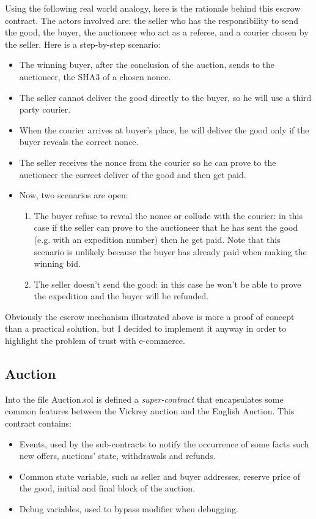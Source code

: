 \documentclass{article}
\begin{document}
Using the following real world analogy, here is the rationale behind this escrow contract. The actors involved are: the seller who has the responsibility to send the good, the buyer, the auctioneer who act as a referee, and a courier chosen by the seller. Here is a step-by-step scenario:
\begin{itemize}
    \item The winning buyer, after the conclusion of the auction, sends to the auctioneer, the SHA3 of a chosen nonce.
    \item The seller cannot deliver the good directly to the buyer, so he will use a third party courier.
    \item When the courier arrives at buyer's place, he will deliver the good only if the buyer reveals the correct nonce. 
    \item The seller receives the nonce from the courier so he can prove to the auctioneer the correct deliver of the good and then get paid.
    \item Now, two scenarios are open:
    \begin{enumerate}
        \item The buyer refuse to reveal the nonce or collude with the courier: in this case if the seller can prove to the auctioneer that he has sent the good (e.g. with an expedition number) then he get paid. Note that this scenario is unlikely because the buyer has already paid when making the winning bid.
        \item The seller doesn't send the good: in this case he won't be able to prove the expedition and the buyer will be refunded.
    \end{enumerate}
\end{itemize}

Obviously the escrow mechanism illustrated above is more a proof of concept than a practical solution, but I decided to implement it anyway in order to highlight the problem of trust with e-commerce.
\subsection{Auction}
Into the file Auction.sol is defined a \textit{super-contract} that encapsulates some common features between the Vickrey auction and the English Auction.
This contract contains:
\begin{itemize}
    \item Events, used by the sub-contracts to notify the occurrence of some facts such new offers, auctions' state, withdrawals and refunds.
    \item Common state variable, such as seller and buyer addresses, reserve price of the good, initial and final block of the auction.
    \item Debug variables, used to bypass modifier when debugging.
\end{itemize}
\end{document}
